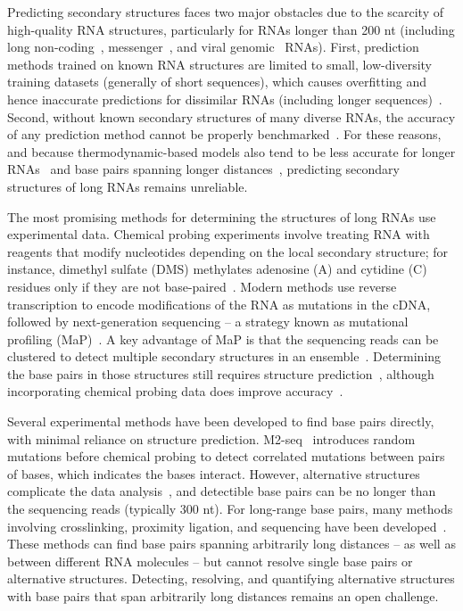 \documentclass[main.tex]{subfiles}
\begin{document}
Predicting secondary structures faces two major obstacles due to the scarcity of high-quality RNA structures, particularly for RNAs longer than 200 nt (including long non-coding~\cite{Quinn2016}, messenger~\cite{Lange2012}, and viral genomic~\cite{Nicholson2015} RNAs).
First, prediction methods trained on known RNA structures are limited to small, low-diversity training datasets (generally of short sequences), which causes overfitting and hence inaccurate predictions for dissimilar RNAs (including longer sequences)~\cite{Flamm2022,Sato2023}.
Second, without known secondary structures of many diverse RNAs, the accuracy of any prediction method cannot be properly benchmarked~\cite{Lange2012,Mathews2019}.
For these reasons, and because thermodynamic-based models also tend to be less accurate for longer RNAs~\cite{Nicholson2015} and base pairs spanning longer distances~\cite{Doshi2004}, predicting secondary structures of long RNAs remains unreliable.

The most promising methods for determining the structures of long RNAs use experimental data.
Chemical probing experiments involve treating RNA with reagents that modify nucleotides depending on the local secondary structure; for instance, dimethyl sulfate (DMS) methylates adenosine (A) and cytidine (C) residues only if they are not base-paired~\cite{Kubota2015}.
Modern methods use reverse transcription to encode modifications of the RNA as mutations in the cDNA, followed by next-generation sequencing -- a strategy known as mutational profiling (MaP)~\cite{Siegfried2014,Zubradt2016}.
A key advantage of MaP is that the sequencing reads can be clustered to detect multiple secondary structures in an ensemble~\cite{Tomezsko2020,Morandi2021}.
Determining the base pairs in those structures still requires structure prediction~\cite{Mathews2004a}, although incorporating chemical probing data does improve accuracy~\cite{Cordero2012,Sloma2015}.

Several experimental methods have been developed to find base pairs directly, with minimal reliance on structure prediction.
M2-seq~\cite{Cheng2017} introduces random mutations before chemical probing to detect correlated mutations between pairs of bases, which indicates the bases interact.
However, alternative structures complicate the data analysis~\cite{Cordero2015}, and detectible base pairs can be no longer than the sequencing reads (typically 300 nt).
For long-range base pairs, many methods involving crosslinking, proximity ligation, and sequencing have been developed~\cite{Kudla2020}.
These methods can find base pairs spanning arbitrarily long distances -- as well as between different RNA molecules -- but cannot resolve single base pairs or alternative structures.
Detecting, resolving, and quantifying alternative structures with base pairs that span arbitrarily long distances remains an open challenge.
\end{document}
